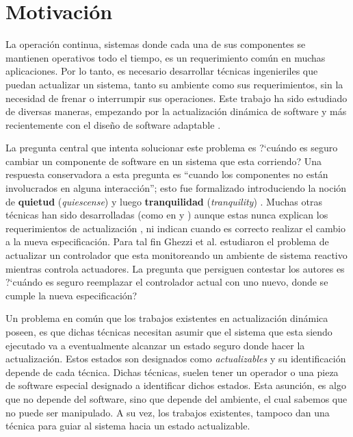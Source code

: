 \section{Motivación}

La operación continua, sistemas donde cada una de sus componentes se mantienen operativos todo el tiempo, es un
requerimiento común en muchas aplicaciones. Por lo tanto, es necesario desarrollar técnicas ingenieriles que puedan
actualizar un sistema, tanto su ambiente como sus requerimientos, sin la necesidad de frenar o interrumpir sus
operaciones. Este trabajo ha sido estudiado de diversas maneras, empezando por la actualización dinámica de software
\cite{60317} y más recientemente con el diseño de software adaptable \cite{SEAMS}.

La pregunta central que intenta solucionar este problema es ?`cuándo es seguro cambiar un componente de software en un sistema
que esta corriendo? Una respuesta conservadora a esta pregunta es ``cuando los componentes no están involucrados en
alguna interacción''; esto fue formalizado introduciendo la noción de \textbf{quietud} (\emph{quiescense}) \cite{60317} y luego
\textbf{tranquilidad} (\emph{tranquility}) \cite{4359466}. Muchas otras técnicas han sido desarrolladas (como en
\cite{Anderson:2009:MPM:1656437.1656448} y \cite{485222}) aunque estas nunca explican los requerimientos de
actualización \cite{Baresi:2010:DBD:1882362.1882367}, ni indican cuando es correcto realizar el cambio a la nueva especificación.
Para tal fin Ghezzi et al. \cite{6224401,PanzicaLaManna:2013:FCC:2487336.2487349} estudiaron el problema de actualizar un
controlador que esta monitoreando un ambiente de sistema reactivo mientras controla actuadores. La pregunta que persiguen
contestar los autores es ?`cuándo es seguro reemplazar el controlador actual con uno nuevo, donde se cumple la nueva
especificación?

Un problema en común que los trabajos existentes en actualización dinámica poseen, es que dichas técnicas necesitan
asumir que el sistema que esta siendo ejecutado va a eventualmente alcanzar un estado seguro donde hacer la
actualización. Estos estados son designados como \emph{actualizables} y su identificación depende de cada técnica.
Dichas técnicas, suelen tener un operador o una pieza de software especial designado a identificar dichos estados. Esta asunción, es algo
que no depende del software, sino que depende del ambiente, el cual sabemos que no puede ser manipulado. A su vez, los trabajos
existentes, tampoco dan una técnica para guiar al sistema hacia un estado actualizable. 

